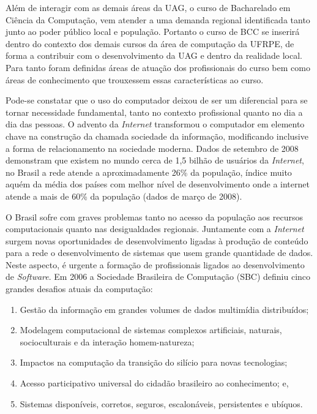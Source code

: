 \documentclass[
	12pt,				%
	openright,			%
  oneside,     %
	a4paper,			%
	english,			%
	french,				%
	spanish,			%
	brazil				%
	]{abntex2}
\begin{document}
Além de interagir com as demais áreas da UAG, o curso de Bacharelado em Ciência
da Computação, vem atender a uma demanda regional identificada tanto junto ao
poder público local e população. Portanto o curso de BCC se
inserirá dentro do contexto dos demais cursos da área de computação da UFRPE, de
forma a contribuir com o desenvolvimento da UAG e dentro da realidade local.
Para tanto foram definidas áreas de atuação dos profissionais do curso bem como
áreas de conhecimento que trouxessem essas características ao curso.

Pode-se constatar que o uso do computador deixou de ser um diferencial para se
tornar necessidade fundamental, tanto no contexto profissional quanto no dia a
dia das pessoas. O advento da \textit{Internet} transformou o computador em elemento
chave na construção da chamada sociedade da informação, modificando inclusive a
forma de relacionamento na sociedade moderna. Dados de setembro de 2008
demonstram que existem no mundo cerca de 1,5 bilhão de usuários da
\textit{Internet}, no Brasil a rede atende a aproximadamente 26\% da população,
índice muito aquém da média dos países com melhor nível de desenvolvimento onde a internet atende a
mais de 60\% da população (dados de março de 2008).

O Brasil sofre com graves problemas tanto no acesso da população aos recursos
computacionais quanto nas desigualdades regionais. Juntamente com a \textit{Internet}
surgem novas oportunidades  de desenvolvimento ligadas à produção de conteúdo
para a rede o desenvolvimento de sistemas que usem grande quantidade de dados. Neste aspecto, é urgente a
formação de profissionais ligados ao desenvolvimento de \textit{Software}. Em
2006 a Sociedade Brasileira de Computação (SBC) definiu cinco grandes desafios atuais
da computação:

\begin{enumerate}
  \item Gestão da informação em grandes volumes de dados multimídia distribuídos;
  \item Modelagem computacional de sistemas complexos artificiais, naturais,
  socioculturais e da interação homem-natureza;
  \item Impactos na computação da transição do silício para novas tecnologias;
  \item Acesso participativo universal do cidadão brasileiro ao conhecimento; e,
  \item Sistemas disponíveis, corretos, seguros, escalonáveis, persistentes e ubíquos.
\end{enumerate}
\end{document}
